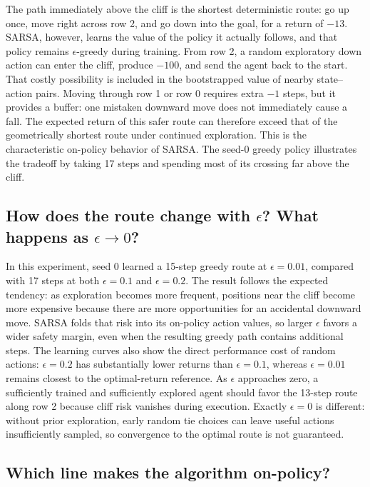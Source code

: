 \documentclass[11pt]{article}
\begin{document}
The path immediately above the cliff is the shortest deterministic route: go
up once, move right across row 2, and go down into the goal, for a return of
$-13$.  SARSA, however, learns the value of the policy it actually follows,
and that policy remains $\epsilon$-greedy during training.  From row 2, a
random exploratory down action can enter the cliff, produce $-100$, and send
the agent back to the start.  That costly possibility is included in the
bootstrapped value of nearby state--action pairs.  Moving through row 1 or row
0 requires extra $-1$ steps, but it provides a buffer: one mistaken downward
move does not immediately cause a fall.  The expected return of this safer
route can therefore exceed that of the geometrically shortest route under
continued exploration.  This is the characteristic on-policy behavior of
SARSA.  The seed-0 greedy policy illustrates the tradeoff by taking 17 steps
and spending most of its crossing far above the cliff.

\subsection{How does the route change with $\epsilon$? What happens as
$\epsilon\to0$?}

In this experiment, seed 0 learned a 15-step greedy route at
$\epsilon=0.01$, compared with 17 steps at both $\epsilon=0.1$ and
$\epsilon=0.2$.  The result follows the expected tendency: as exploration
becomes more frequent, positions near the cliff become more expensive because
there are more opportunities for an accidental downward move.  SARSA folds
that risk into its on-policy action values, so larger $\epsilon$ favors a wider
safety margin, even when the resulting greedy path contains additional
steps.  The learning curves also show the direct performance cost of random
actions: $\epsilon=0.2$ has substantially lower returns than $\epsilon=0.1$,
whereas $\epsilon=0.01$ remains closest to the optimal-return reference.  As
$\epsilon$ approaches zero, a sufficiently trained and sufficiently explored
agent should favor the 13-step route along row 2 because cliff risk vanishes
during execution.  Exactly $\epsilon=0$ is different: without prior
exploration, early random tie choices can leave useful actions insufficiently
sampled, so convergence to the optimal route is not guaranteed.

\subsection{Which line makes the algorithm on-policy?}
\end{document}
